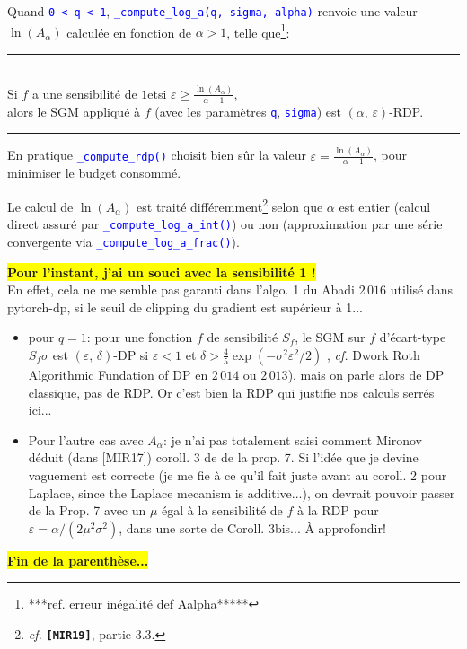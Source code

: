 \documentclass[a4paper,11pt]{article} %
\newcommand{\code}[1]{\textcolor{blue}{\texttt{#1}}}
\newcommand{\REM}[1]{\colorbox{yellow}{\color{red}\textbf{#1}}}
\newcommand{\prop}[1]{\begin{center}\rule{0.95\linewidth}{0.5pt}\\\textsf{#1}\\\rule{0.95\linewidth}{0.5pt}\end{center}}
\begin{document}
Quand \code{0 < q < 1}, \code{\_compute\_log\_a(q, sigma, alpha)} renvoie une valeur $\ln(A_\alpha)$ calculée en fonction de $\alpha>1$, telle que\footnote{***ref. erreur inégalité def Aalpha*****}:
\prop{
    Si $f$ a une sensibilité de $1$\quad et\quad si $\varepsilon \geqslant \frac{\ln (A_\alpha)}{\alpha - 1}$,\\
    alors le SGM appliqué à $f$ (avec les paramètres \code{q}, \code{sigma}) est $(\alpha,\, \varepsilon)$-RDP.
    }
En pratique \code{\_compute\_rdp()} choisit bien sûr la valeur $\varepsilon = \frac{\ln (A_\alpha)}{\alpha - 1}$, pour minimiser le budget consommé. 

Le calcul de $\ln(A_\alpha)$ est traité différemment\footnote{\emph{cf.} \textbf{\texttt{[MIR19]}}, partie \textsf{3.3}.} selon que $\alpha$ est entier (calcul direct assuré par \code{\_compute\_log\_a\_int()}) ou non (approximation par une série convergente via \code{\_compute\_log\_a\_frac()}).

\REM{Pour l'instant, j'ai un souci avec la sensibilité 1 !}\\
En effet, cela ne me semble pas garanti dans l'algo. 1 du \og Abadi $2\,016$\fg{} utilisé dans pytorch-dp, si le seuil de clipping du gradient est supérieur à 1...\vspace{-0.4em}

\begin{itemize}
    \item 
    pour $q=1$: pour une fonction $f$ de sensibilité $S_f$, le SGM sur $f$ d'écart-type $S_f \sigma$ est $(\varepsilon,\, \delta)$-DP si $\varepsilon<1$ et $\delta>\frac{4}{5}\exp(-\sigma^2\varepsilon^2/2)$ , \emph{cf.} Dwork Roth \og Algorithmic Fundation of DP\fg{} en $2\,014$ ou $2\,013$), mais on parle alors de DP classique, pas de RDP. Or c'est bien la RDP qui justifie nos calculs \og serrés\fg{} ici...
    \item 
    Pour l'autre cas avec $A_\alpha$: je n'ai pas totalement saisi comment Mironov déduit (dans [MIR17]) coroll. 3 de de la prop. 7. Si l'idée que je devine vaguement est correcte (je me fie à ce qu'il fait juste avant au coroll. 2 pour Laplace, \og since the Laplace mecanism is additive...\fg{}), on devrait pouvoir passer de la Prop. 7 avec un $\mu$ égal à la sensibilité de $f$ à la RDP pour $\varepsilon = \alpha / (2\mu^2\sigma^2)$, dans une sorte de Coroll. 3bis... À approfondir!
\end{itemize}
\REM{Fin de la parenthèse...}\\
\end{document}
